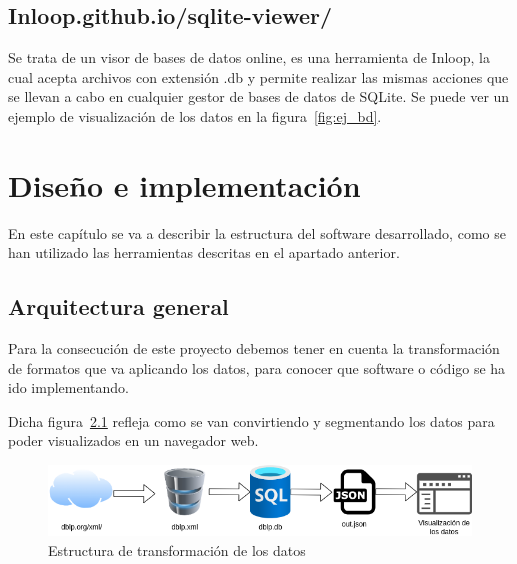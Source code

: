 \documentclass[a4paper, 12pt]{book}
\begin{document}
\section{Inloop.github.io/sqlite-viewer/}

Se trata de un visor de bases de datos online, es una herramienta de Inloop, la cual acepta archivos con extensión .db y permite realizar las mismas acciones que se llevan a cabo en cualquier gestor de bases de datos de SQLite. Se puede ver un ejemplo de visualización de los datos en la figura~\ref{fig:ej_bd}.


\cleardoublepage
\chapter{Diseño e implementación}
\label{sec:diseno}

En este capítulo se va a describir la estructura del software desarrollado, como se han utilizado las herramientas descritas en el apartado anterior.

\section{Arquitectura general} 
\label{sec:arquitectura}

Para la consecución de este proyecto debemos tener en cuenta la transformación de formatos que va aplicando los datos, para conocer que software o código se ha ido implementando.


Dicha figura~\ref{fig:arquitectura} refleja como se van convirtiendo y segmentando los datos para poder visualizados en un navegador web.

\begin{figure}[h]
  \centering
  \includegraphics[width=16cm, keepaspectratio]{img/esquemadatos_com.png}
  \caption{Estructura de transformación de los datos}
  \label{fig:arquitectura}
\end{figure}
\end{document}
